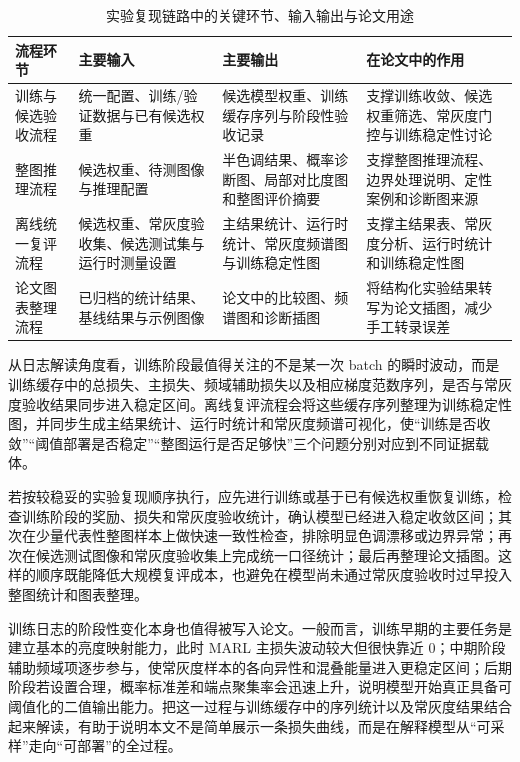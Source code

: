 \documentclass[thesis]{../zstucs-graduation-project}
\begin{document}
\begin{table}[H]
    \centering
    \small
    \caption{实验复现链路中的关键环节、输入输出与论文用途}
    \label{tab:4-3}
    \begin{tabularx}{0.98\textwidth}{>{\raggedright\arraybackslash}p{}>{\raggedright\arraybackslash}p{}YY}
        \toprule
        流程环节 & 主要输入 & 主要输出 & 在论文中的作用 \\
        \midrule
        训练与候选验收流程 & 统一配置、训练/验证数据与已有候选权重 & 候选模型权重、训练缓存序列与阶段性验收记录 & 支撑训练收敛、候选权重筛选、常灰度门控与训练稳定性讨论 \\
        整图推理流程 & 候选权重、待测图像与推理配置 & 半色调结果、概率诊断图、局部对比度图和整图评价摘要 & 支撑整图推理流程、边界处理说明、定性案例和诊断图来源 \\
        离线统一复评流程 & 候选权重、常灰度验收集、候选测试集与运行时测量设置 & 主结果统计、运行时统计、常灰度频谱图与训练稳定性图 & 支撑主结果表、常灰度分析、运行时统计和训练稳定性图 \\
        论文图表整理流程 & 已归档的统计结果、基线结果与示例图像 & 论文中的比较图、频谱图和诊断插图 & 将结构化实验结果转写为论文插图，减少手工转录误差 \\
        \bottomrule
    \end{tabularx}
\end{table}

    从日志解读角度看，训练阶段最值得关注的不是某一次 batch 的瞬时波动，而是训练缓存中的总损失、主损失、频域辅助损失以及相应梯度范数序列，是否与常灰度验收结果同步进入稳定区间。离线复评流程会将这些缓存序列整理为训练稳定性图，并同步生成主结果统计、运行时统计和常灰度频谱可视化，使“训练是否收敛”“阈值部署是否稳定”“整图运行是否足够快”三个问题分别对应到不同证据载体。

    若按较稳妥的实验复现顺序执行，应先进行训练或基于已有候选权重恢复训练，检查训练阶段的奖励、损失和常灰度验收统计，确认模型已经进入稳定收敛区间；其次在少量代表性整图样本上做快速一致性检查，排除明显色调漂移或边界异常；再次在候选测试图像和常灰度验收集上完成统一口径统计；最后再整理论文插图。这样的顺序既能降低大规模复评成本，也避免在模型尚未通过常灰度验收时过早投入整图统计和图表整理。

    训练日志的阶段性变化本身也值得被写入论文。一般而言，训练早期的主要任务是建立基本的亮度映射能力，此时 MARL 主损失波动较大但很快靠近 0；中期阶段辅助频域项逐步参与，使常灰度样本的各向异性和混叠能量进入更稳定区间；后期阶段若设置合理，概率标准差和端点聚集率会迅速上升，说明模型开始真正具备可阈值化的二值输出能力。把这一过程与训练缓存中的序列统计以及常灰度结果结合起来解读，有助于说明本文不是简单展示一条损失曲线，而是在解释模型从“可采样”走向“可部署”的全过程。
\end{document}
